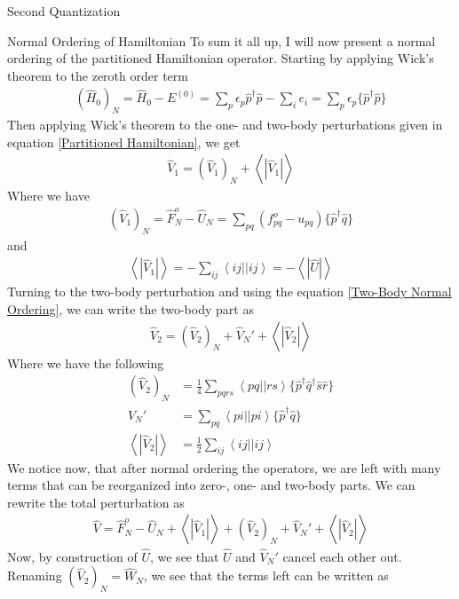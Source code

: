 \documentclass[twoside,english]{uiofysmaster}
\begin{document}
\begin{chapter}{Second Quantization}
	\begin{section}{Normal Ordering of Hamiltonian}
		To sum it all up, I will now present a normal ordering of the partitioned Hamiltonian operator. Starting by applying Wick's theorem to the zeroth order term
		\begin{align}
			(\hat H_0)_N = \hat H_0 - E^{(0)} = \sum_p \epsilon_p \hat p^\dagger \hat p - \sum_i e_i = \sum_p \epsilon_p \{\hat p^\dagger \hat p\}
		\end{align}
		Then applying Wick's theorem to the one- and two-body perturbations given in equation \ref{Partitioned Hamiltonian}, we get 
		\begin{align}
			\hat V_1 = (\hat V_1)_N + \left< \right. | \hat V_1 | \left. \right>
		\end{align}
		Where we have 
		\begin{align}
			(\hat V_1)_N = \hat F_N^o - \hat U_N = \sum_{pq}(f_{pq}^o - u_{pq})\{ \hat p^\dagger \hat q \}
		\end{align}
		and
		\begin{align}
			\left< \right. | \hat V_1 | \left. \right> = -\sum_{ij} \left< ij || ij \right> = - \left< \right. | \hat U | \left. \right> 
		\end{align}
		Turning to the two-body perturbation and using the equation \ref{Two-Body Normal Ordering}, we can write the two-body part as
		\begin{align}
			\hat V_2 = (\hat V_2)_N + \hat V_N' + \left< \right. | \hat V_2 | \left. \right>
		\end{align}
		Where we have the following 
		\begin{align}
			(\hat V_2)_N &= \frac{1}{4} \sum_{pqrs} \left<pq||rs\right> \{ \hat p^\dagger \hat q^\dagger \hat s \hat r \} \\
			V_N' &= \sum_{pq} \left<pi||pi\right> \{ \hat p^\dagger \hat q \} \\
			\left< \right. | \hat V_2 | \left. \right> &= \frac{1}{2} \sum_{ij} \left<ij||ij\right>
		\end{align}
		We notice now, that after normal ordering the operators, we are left with many terms that can be reorganized into zero-, one- and two-body parts. We can rewrite the total perturbation as
		\begin{align}
			\hat V = \hat F_N^o - \hat U_N + \left< \right. | \hat V_1 | \left. \right> + (\hat V_2)_N + \hat V_N' + \left< \right. | \hat V_2 | \left. \right>
			\label{Total Perturbation}
		\end{align}
		Now, by construction of $\hat U$, we see that $\hat U$ and $\hat V_N'$ cancel each other out. Renaming $(\hat V_2)_N = \hat W_N$, we see that the terms left can be written as 

\end{section}
\end{chapter}
\end{document}
